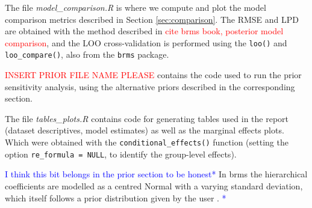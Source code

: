 \documentclass[12pt]{article}
\newcommand{\red}[1]{\textcolor{red}{#1}}
\newcommand{\blue}[1]{\textcolor{blue}{#1}}
\begin{document}
The file \textit{model\_comparison.R} is where we compute and plot the model comparison metrics described in Section \ref{sec:comparison}. The RMSE and LPD are obtained with the method described in \cite{brmsbook} \red{cite brms book, posterior model comparison}, and the LOO cross-validation is performed using the \verb|loo()| and \verb|loo_compare()|, also from the \verb|brms| package.

\red{INSERT PRIOR FILE NAME PLEASE} contains the code used to run the prior sensitivity analysis, using the alternative priors described in the corresponding section.

The file \textit{tables\_plots.R} contains code for generating tables used in the report (dataset descriptives, model estimates) as well as the marginal effects plots. Which were obtained with the \verb|conditional_effects()| function (setting the option \texttt{re\_formula = NULL}, to identify the group-level effects).


\blue{I think this bit belongs in the prior section to be honest*}
In brms the hierarchical coefficients are modelled as a centred Normal with a varying standard deviation, which itself follows a prior distribution given by the user \parencite{brmsbook}. \blue{*} 











\end{document}
